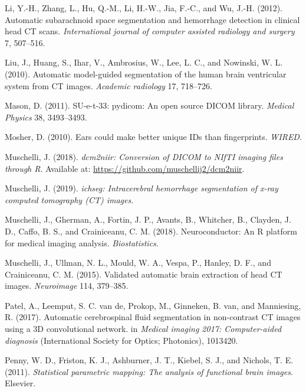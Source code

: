 \documentclass[utf8]{frontiersSCNS}
\begin{document}
\leavevmode\hypertarget{ref-li2012automatic}{}%
Li, Y.-H., Zhang, L., Hu, Q.-M., Li, H.-W., Jia, F.-C., and Wu, J.-H. (2012). Automatic subarachnoid space segmentation and hemorrhage detection in clinical head CT scans. \emph{International journal of computer assisted radiology and surgery} 7, 507--516.

\leavevmode\hypertarget{ref-liu2010automatic}{}%
Liu, J., Huang, S., Ihar, V., Ambrosius, W., Lee, L. C., and Nowinski, W. L. (2010). Automatic model-guided segmentation of the human brain ventricular system from CT images. \emph{Academic radiology} 17, 718--726.

\leavevmode\hypertarget{ref-pydicom}{}%
Mason, D. (2011). SU-e-t-33: pydicom: An open source DICOM library. \emph{Medical Physics} 38, 3493--3493.

\leavevmode\hypertarget{ref-mosher_2010}{}%
Mosher, D. (2010). Ears could make better unique IDs than fingerprints. \emph{WIRED}.

\leavevmode\hypertarget{ref-dcm2niir}{}%
Muschelli, J. (2018). \emph{dcm2niir: Conversion of DICOM to NIfTI imaging files through R}. Available at: \url{https://github.com/muschellij2/dcm2niir}.

\leavevmode\hypertarget{ref-ichseg}{}%
Muschelli, J. (2019). \emph{ichseg: Intracerebral hemorrhage segmentation of x-ray computed tomography (CT) images}.

\leavevmode\hypertarget{ref-neuroconductor}{}%
Muschelli, J., Gherman, A., Fortin, J. P., Avants, B., Whitcher, B., Clayden, J. D., Caffo, B. S., and Crainiceanu, C. M. (2018). Neuroconductor: An R platform for medical imaging analysis. \emph{Biostatistics}.

\leavevmode\hypertarget{ref-ctbet}{}%
Muschelli, J., Ullman, N. L., Mould, W. A., Vespa, P., Hanley, D. F., and Crainiceanu, C. M. (2015). Validated automatic brain extraction of head CT images. \emph{Neuroimage} 114, 379--385.

\leavevmode\hypertarget{ref-patel2017automatic}{}%
Patel, A., Leemput, S. C. van de, Prokop, M., Ginneken, B. van, and Manniesing, R. (2017). Automatic cerebrospinal fluid segmentation in non-contrast CT images using a 3D convolutional network. in \emph{Medical imaging 2017: Computer-aided diagnosis} (International Society for Optics; Photonics), 1013420.

\leavevmode\hypertarget{ref-spm}{}%
Penny, W. D., Friston, K. J., Ashburner, J. T., Kiebel, S. J., and Nichols, T. E. (2011). \emph{Statistical parametric mapping: The analysis of functional brain images}. Elsevier.
\end{document}
